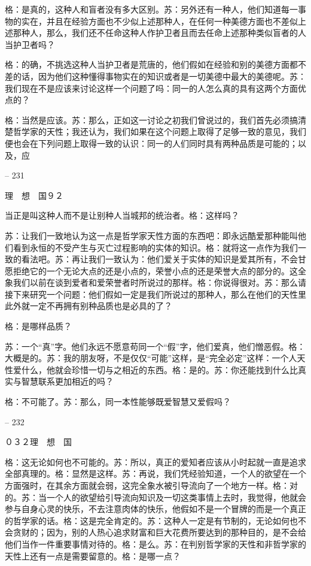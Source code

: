 \documentclass[11pt,oneside]{book}
\begin{document}
\begin{common-format}
    格：是真的，这种人和盲者没有多大区别。苏：另外还有一种人，他们知道每一事物的实在，并且在经验方面也不少似上述那种人，在任何一种美德方面也不差似上述那种人，那么，我们还不任命这种人作护卫者且而去任命上述那种类似盲者的人当护卫者吗？

    格：的确，不挑选这种人当护卫者是荒唐的，他们假如在经验和别的美德方面都不差的话，因为他们这种懂得事物实在的知识或者是一切美德中最大的美德呢。苏：我们现在不是应该来讨论这样一个问题了吗：同一的人怎么真的具有这两个方面优点的？

    格：当然是应该。苏：那么，正如这一讨论之初我们曾说过的，我们首先必须搞清楚哲学家的天性；我还认为，我们如果在这个问题上取得了足够一致的意见，我们便也会在下列问题上取得一致的认识：同一的人们同时具有两种品质是可能的；以及，应

    

-- 231

    理　想　国９２

    当正是叫这种人而不是让别种人当城邦的统治者。格：这样吗？

    苏：让我们一致地认为这一点是哲学家天性方面的东西吧：即永远酷爱那种能叫他们看到永恒的不受产生与灭亡过程影响的实体的知识。格：就将这一点作为我们一致的看法吧。苏：再让我们一致认为：他们爱关于实体的知识是爱其所有，不会甘愿拒绝它的一个无论大点的还是小点的，荣誉小点的还是荣誉大点的部分的。这全象我们以前在谈到爱者和爱荣誉者时所说过的那样。格：你说得很对。苏：那么请接下来研究一个问题：他们假如一定是我们所说过的那种人，那么在他们的天性里此外就一定不再拥有别种品质也是必具的了？

    格：是哪样品质？

    苏：一个“真”字。他们永远不愿意苟同一个“假”字，他们爱真，他们憎恶假。格：大概是的。苏：我的朋友呀，不是仅仅“可能”这样，是“完全必定”这样：一个人天性爱什么，他就会珍惜一切与之相近的东西。格：是的。苏：你还能找到什么比真实与智慧联系更加相近的吗？

    格：不可能了。苏：那么，同一本性能够既爱智慧又爱假吗？

    

-- 232

    ０３２理　想　国

    格：这无论如何也不可能的。苏：所以，真正的爱知者应该从小时起就一直是追求全部真理的。格：显然是这样。苏：再说，我们凭经验知道，一个人的欲望在一个方面强时，在其余方面就会弱，这完全象水被引导流向了一个地方一样。格：对的。苏：当一个人的欲望给引导流向知识及一切这类事情上去时，我觉得，他就会参与自身心灵的快乐，不去注意肉体的快乐，他假如不是一个冒牌的而是一个真正的哲学家的话。格：这是完全肯定的。苏：这种人一定是有节制的，无论如何也不会贪财的；因为，别的人热心追求财富和巨大花费所要达到的那种目的，是不会给他们当作一件重要事情对待的。格：是么。苏：在判别哲学家的天性和非哲学家的天性上还有一点是需要留意的。格：是哪一点？


\end{common-format}
\end{document}
